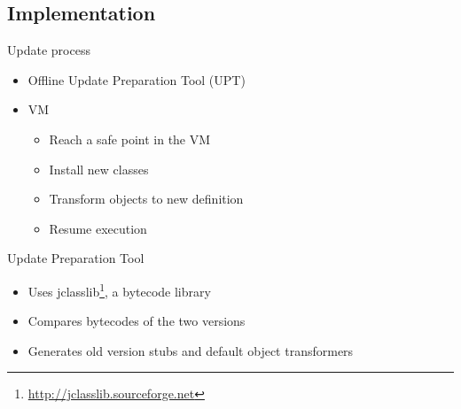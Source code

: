 

\subsection{Implementation}
\ShowTOC

\begin{frame}[t,fragile]{Update process}%
\JvolveTimeLine{}{}{}{}{}
\begin{itemize}
\item Offline Update Preparation Tool (UPT)
\item \DSU{} VM
  \begin{itemize}
  \item Reach a safe point in the VM%
  \item Install new classes%
  \item Transform objects to new definition%
  \item Resume execution
  \end{itemize}
\end{itemize}
\end{frame}

\begin{frame}[t,fragile,label=offline]{Update Preparation Tool}%
\begin{itemize}
\item Uses jclasslib\footnote{\url{http://jclasslib.sourceforge.net}}, a
bytecode library
\item Compares bytecodes of the two versions
\item Generates old version stubs and default object transformers
\end{itemize}
\end{frame}

